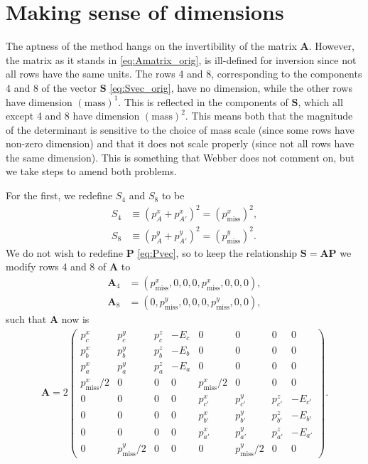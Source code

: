 \documentclass[twoside,english]{uiofysmaster}
\begin{document}
\section{Making sense of dimensions}\label{sec:dimension_fixing}
The aptness of the method hangs on the invertibility of the matrix $\mathbf{A}$. However, the matrix as it stands in \eqref{eq:Amatrix_orig}, is ill-defined for inversion since not all rows have the same units. The rows 4 and 8, corresponding to the components 4 and 8 of the vector $\mathbf{S}$ \eqref{eq:Svec_orig}, have no dimension, while the other rows have dimension $(\mathrm{mass})^1$. This is reflected in the components of $\mathbf{S}$, which all except 4 and 8 have dimension $(\mathrm{mass})^2$. This means both that the magnitude of the determinant is sensitive to the choice of mass scale (since some rows have non-zero dimension) and that it does not scale properly (since not all rows have the same dimension). This is something that Webber does not comment on, but we take steps to amend both problems.

For the first, we redefine $S_4$ and $S_8$ to be 
\begin{align}
	S_4 &\equiv (p_A^x + p_{A'}^x)^2 = (p_\mathrm{miss}^x)^2, \label{eq:Svec_modified} \\
	S_8 &\equiv (p_A^y + p_{A'}^y)^2 = (p_\mathrm{miss}^y)^2. \nonumber
\end{align}
We do not wish to redefine $\mathbf{P}$ \eqref{eq:Pvec}, so to keep the relationship $\mathbf{S} = \mathbf{A}\mathbf{P}$ we modify rows 4 and 8 of $\mathbf{A}$ to
\begin{align}
	\mathbf{A}_4 &= (p_\mathrm{miss}^x, 0, 0, 0, p_\mathrm{miss}^x, 0, 0, 0),\\
	\mathbf{A}_8 &= (0, p_\mathrm{miss}^y, 0, 0, 0, p_\mathrm{miss}^y, 0, 0),\nonumber
\end{align}
such that $\mathbf{A}$ now is
\begin{align}
	\mathbf{A} = 2 \begin{pmatrix}
						p_c^x & p_c^y & p_c^z & -E_c & 0 & 0 & 0 & 0 \\
						p_b^x & p_b^y & p_b^z & -E_b & 0 & 0 & 0 & 0 \\
						p_a^x & p_a^y & p_a^z & -E_a & 0 & 0 & 0 & 0 \\
						p_\mathrm{miss}^x/2 & 0 & 0 & 0 & p_\mathrm{miss}^x/2 & 0 & 0 & 0\\
						0 & 0 & 0 & 0 & p_{c'}^x & p_{c'}^y & p_{c'}^z & -E_{c'} \\
						0 & 0 & 0 & 0 & p_{b'}^x & p_{b'}^y & p_{b'}^z & -E_{b'} \\
						0 & 0 & 0 & 0 & p_{a'}^x & p_{a'}^y & p_{a'}^z & -E_{a'} \\
						0 & p_\mathrm{miss}^y/2 & 0 & 0 & 0 & p_\mathrm{miss}^y/2 & 0 & 0
					\end{pmatrix}. \label{eq:Amatrix_modified}
\end{align}
\end{document}
